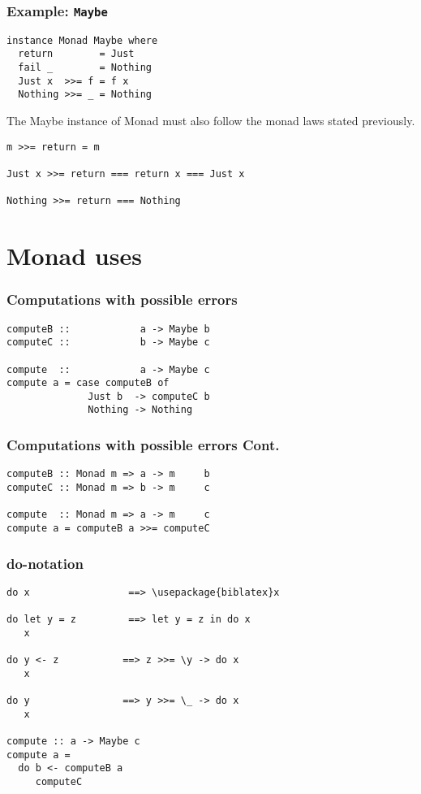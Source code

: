\documentclass{beamer} %
\begin{document}
\begin{frame}[fragile]\frametitle{Example: \texttt{Maybe}}
\begin{verbatim}
instance Monad Maybe where
  return        = Just
  fail _        = Nothing
  Just x  >>= f = f x
  Nothing >>= _ = Nothing
\end{verbatim}
The Maybe instance of Monad must also follow the monad laws stated previously.
\begin{verbatim}
m >>= return = m

Just x >>= return === return x === Just x

Nothing >>= return === Nothing
\end{verbatim}
\end{frame}

\section{Monad uses}

\begin{frame}[fragile]\frametitle{Computations with possible errors}
\begin{verbatim}
computeB ::            a -> Maybe b
computeC ::            b -> Maybe c

compute  ::            a -> Maybe c
compute a = case computeB of
              Just b  -> computeC b
              Nothing -> Nothing
\end{verbatim}
\end{frame}

\begin{frame}[fragile]\frametitle{Computations with possible errors Cont.}
\begin{verbatim}
computeB :: Monad m => a -> m     b
computeC :: Monad m => b -> m     c

compute  :: Monad m => a -> m     c
compute a = computeB a >>= computeC
\end{verbatim}
\end{frame}

\begin{frame}[fragile]\frametitle{do-notation}
\begin{verbatim}
do x                 ==> \usepackage{biblatex}x

do let y = z         ==> let y = z in do x
   x

do y <- z           ==> z >>= \y -> do x
   x

do y                ==> y >>= \_ -> do x
   x

compute :: a -> Maybe c
compute a = 
  do b <- computeB a
     computeC
\end{verbatim}
\end{frame}
\end{document}
